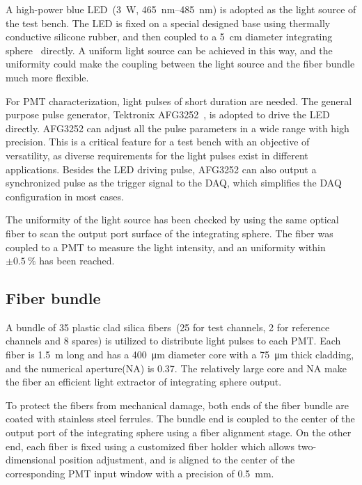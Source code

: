 \documentclass[a4paper,10pt,twoside]{cpc-hepnp}
\begin{document}
\begin{multicols}{2}
A high-power blue LED~\citep{z-light}(\SI{3}{\watt},  \SIrange{465}{485}{\nano\meter}) is adopted as the light source of the test bench.
The LED is fixed on a special designed base using thermally conductive silicone rubber, and then coupled to a  \SI{5}{\centi\meter} diameter integrating sphere~\citep{integrating_sphere} directly.
A uniform light source can be achieved in this way, and the uniformity could make the coupling between the light source and the fiber bundle much more flexible.

For PMT characterization, light pulses of short duration are needed.
The general purpose pulse generator, Tektronix AFG3252~\citep{afg3252}, is adopted to drive the LED directly.
AFG3252 can adjust all the pulse parameters in a wide range with high precision. This is a critical feature for a test bench with an objective of versatility, as diverse requirements for the light pulses exist in different applications. 
Besides the LED driving pulse, AFG3252 can also output a synchronized pulse as the trigger signal to the DAQ, which  simplifies the DAQ configuration in most cases. 

The uniformity of the light source has been checked by using the same optical fiber to scan the output port surface of the integrating sphere. The fiber was coupled to a PMT to measure the light intensity, and an uniformity within $\pm\SI{0.5}{\percent}$ has been reached.

\subsection{Fiber bundle}
\label{sec:fiber_bundle}

A bundle of 35 plastic clad silica fibers~\citep{optical_fibre}(25 for test channels, 2 for reference channels and 8 spares) is utilized to distribute light pulses to each PMT.
Each fiber is \SI{1.5}{\meter} long and has a \SI{400}{\micro\meter} diameter core with a \SI{75}{\micro\meter} thick cladding, and the numerical aperture(NA) is 0.37.
The relatively large core and NA make the fiber an efficient light extractor of integrating sphere output. 

To protect the fibers from mechanical damage, both ends of the fiber bundle are coated with stainless steel ferrules.
The bundle end is coupled to the center of the output port of the integrating sphere using a fiber alignment stage.
On the other end, each fiber is fixed using a customized fiber holder which allows two-dimensional position adjustment, and is aligned to the center of the corresponding PMT input window with a precision of \SI{0.5}{\milli\meter}.


\end{multicols}
\end{document}
